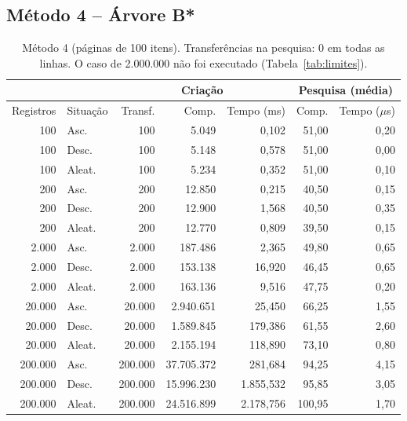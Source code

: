 \documentclass{article}
\begin{document}
\subsection{Método 4 -- Árvore B*}

\begin{table}[!htb]
    \centering
    \small
    \begin{tabular}{|r|l|r|r|r|r|r|}
        \hline\hline
        & & \multicolumn{3}{c|}{Criação} & \multicolumn{2}{c|}{Pesquisa (média)} \\\hline
        Registros & Situação & Transf. & Comp. & Tempo (ms) & Comp. & Tempo ($\mu$s) \\\hline
        100     & Asc.   & 100     & 5.049      & 0,102     & 51,00  & 0,20 \\
        100     & Desc.  & 100     & 5.148      & 0,578     & 51,00  & 0,00 \\
        100     & Aleat. & 100     & 5.234      & 0,352     & 51,00  & 0,10 \\\hline
        200     & Asc.   & 200     & 12.850     & 0,215     & 40,50  & 0,15 \\
        200     & Desc.  & 200     & 12.900     & 1,568     & 40,50  & 0,35 \\
        200     & Aleat. & 200     & 12.770     & 0,809     & 39,50  & 0,15 \\\hline
        2.000   & Asc.   & 2.000   & 187.486    & 2,365     & 49,80  & 0,65 \\
        2.000   & Desc.  & 2.000   & 153.138    & 16,920    & 46,45  & 0,65 \\
        2.000   & Aleat. & 2.000   & 163.136    & 9,516     & 47,75  & 0,20 \\\hline
        20.000  & Asc.   & 20.000  & 2.940.651  & 25,450    & 66,25  & 1,55 \\
        20.000  & Desc.  & 20.000  & 1.589.845  & 179,386   & 61,55  & 2,60 \\
        20.000  & Aleat. & 20.000  & 2.155.194  & 118,890   & 73,10  & 0,80 \\\hline
        200.000 & Asc.   & 200.000 & 37.705.372 & 281,684   & 94,25  & 4,15 \\
        200.000 & Desc.  & 200.000 & 15.996.230 & 1.855,532 & 95,85  & 3,05 \\
        200.000 & Aleat. & 200.000 & 24.516.899 & 2.178,756 & 100,95 & 1,70 \\\hline\hline
    \end{tabular}
    \caption{\label{tab:m4}Método 4 (páginas de 100 itens). Transferências na pesquisa: 0 em todas as linhas. O caso de 2.000.000 não foi executado (Tabela~\ref{tab:limites}).}
\end{table}
\end{document}
